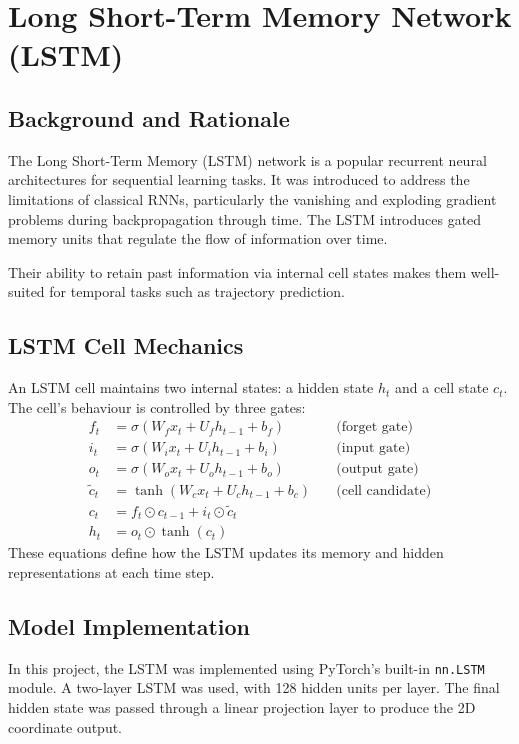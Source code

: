 \section{Long Short-Term Memory Network (LSTM)}

\subsection{Background and Rationale}
The Long Short-Term Memory (LSTM) network is a popular recurrent neural architectures for sequential learning tasks. It was introduced to address the limitations of classical RNNs, particularly the vanishing and exploding gradient problems during backpropagation through time. The LSTM introduces gated memory units that regulate the flow of information over time.

Their ability to retain past information via internal cell states makes them well-suited for temporal tasks such as trajectory prediction.

\subsection{LSTM Cell Mechanics}
An LSTM cell maintains two internal states: a hidden state $h_t$ and a cell state $c_t$. The cell's behaviour is controlled by three gates:
\[
\begin{aligned}
f_t &= \sigma(W_f x_t + U_f h_{t-1} + b_f) \quad &\text{(forget gate)} \\
i_t &= \sigma(W_i x_t + U_i h_{t-1} + b_i) \quad &\text{(input gate)} \\
o_t &= \sigma(W_o x_t + U_o h_{t-1} + b_o) \quad &\text{(output gate)} \\
\tilde{c}_t &= \tanh(W_c x_t + U_c h_{t-1} + b_c) \quad &\text{(cell candidate)} \\
c_t &= f_t \odot c_{t-1} + i_t \odot \tilde{c}_t \\
h_t &= o_t \odot \tanh(c_t)
\end{aligned}
\]
These equations define how the LSTM updates its memory and hidden representations at each time step.

\subsection{Model Implementation}
In this project, the LSTM was implemented using PyTorch’s built-in \texttt{nn.LSTM} module. A two-layer LSTM was used, with 128 hidden units per layer. The final hidden state was passed through a linear projection layer to produce the 2D coordinate output.

